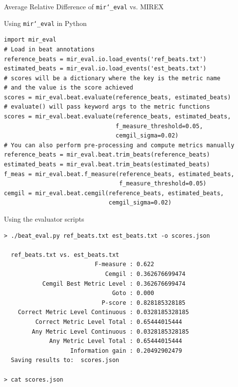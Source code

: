 \documentclass[paperwidth=120cm,paperheight=150cm,portrait,fontscale=.22,margin=5cm,lmargin=.2cm,rmargin=.2cm]{baposter}
\def\mireval{\texttt{mir\char`_eval}}
\begin{document}
\begin{poster}
\begin{posterbox}[name=average,column=0,below=design,span=2]{Average Relative Difference of \mireval{} vs. MIREX}
\end{posterbox}

\begin{posterbox}[name=python,column=0,below=average]{Using \mireval{} in Python}

\begin{verbatim}
import mir_eval
# Load in beat annotations
reference_beats = mir_eval.io.load_events('ref_beats.txt')
estimated_beats = mir_eval.io.load_events('est_beats.txt')
# scores will be a dictionary where the key is the metric name
# and the value is the score achieved
scores = mir_eval.beat.evaluate(reference_beats, estimated_beats)
# evaluate() will pass keyword args to the metric functions
scores = mir_eval.beat.evaluate(reference_beats, estimated_beats,
                                f_measure_threshold=0.05,
                                cemgil_sigma=0.02)
# You can also perform pre-processing and compute metrics manually
reference_beats = mir_eval.beat.trim_beats(reference_beats)
estimated_beats = mir_eval.beat.trim_beats(estimated_beats)
f_meas = mir_eval.beat.f_measure(reference_beats, estimated_beats,
                                 f_measure_threshold=0.05)
cemgil = mir_eval.beat.cemgil(reference_beats, estimated_beats,
                              cemgil_sigma=0.02)
\end{verbatim}

\end{posterbox}

\begin{posterbox}[name=evaluator,column=1,below=average]{Using the evaluator scripts}

\begin{verbatim}
> ./beat_eval.py ref_beats.txt est_beats.txt -o scores.json

  ref_beats.txt vs. est_beats.txt
                          F-measure : 0.622
                             Cemgil : 0.362676699474
           Cemgil Best Metric Level : 0.362676699474
                               Goto : 0.000
                            P-score : 0.828185328185
    Correct Metric Level Continuous : 0.0328185328185
         Correct Metric Level Total : 0.65444015444
        Any Metric Level Continuous : 0.0328185328185
             Any Metric Level Total : 0.65444015444
                   Information gain : 0.20492902479
  Saving results to:  scores.json

> cat scores.json


\end{verbatim}
\end{posterbox}
\end{poster}
\end{document}
